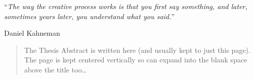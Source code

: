 \documentclass[
11pt, %
english, %
onehalfspacing, %
headsepline, %
chapterinoneline, %
]{MastersDoctoralThesis} %
\begin{document}
\cleardoublepage


\vspace*{0.2\textheight}

\noindent\enquote{\itshape The way the creative process works is that you first say something, and later, sometimes years later, you understand what you said.}\bigbreak

\hfill Daniel Kahneman


\begin{abstract}
\addchaptertocentry{\abstractname} %
The Thesis Abstract is written here (and usually kept to just this page). The page is kept centered vertically so can expand into the blank space above the title too\ldots
\end{abstract}


\begin{acknowledgements}
\addchaptertocentry{\acknowledgementname} %



\end{acknowledgements}


\end{document}
